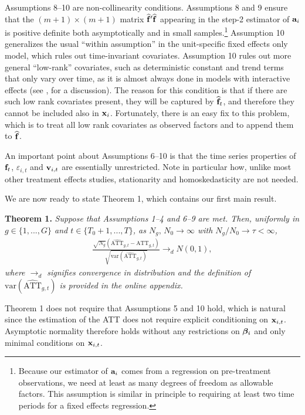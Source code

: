 \documentclass[12pt,fleqn]{article}
\begin{document}
  Assumptions 8--10 are non-collinearity conditions. Assumptions 8 and 9 ensure that the $(m+1)\times (m+1)$ matrix $\widehat{\mathbf{f}}'\widehat{\mathbf{f}}$ appearing in the step-2 estimator of $\mathbf{a}_i$ is positive definite both asymptotically and in small samples.\footnote{Because our estimator of $\mathbf{a}_i$ comes from a regression on pre-treatment observations, we need at least as many degrees of freedom as allowable factors. This assumption is similar in principle to requiring at least two time periods for a fixed effects regression.} Assumption 10 generalizes the usual ``within assumption'' in the unit-specific fixed effects only model, which rules out time-invariant covariates. Assumption 10 rules out more general ``low-rank'' covariates, such as deterministic constant and trend terms that only vary over time, as it is almost always done in models with interactive effects (see \citealp{moon2015linear}, for a discussion). The reason for this condition is that if there are such low rank covariates present, they will be captured by $\widehat{\mathbf{f}}_t$, and therefore they cannot be included also in $\mathbf{x}_{i}$. Fortunately, there is an easy fix to this problem, which is to treat all low rank covariates as observed factors and to append them to $\widehat{\mathbf{f}}$.
  
  An important point about Assumptions 6--10 is that the time series properties of $\mathbf{f}_t$, $\varepsilon_{i,t}$ and $\mathbf{v}_{i,t}$ are essentially unrestricted. Note in particular how, unlike most other treatment effects studies, stationarity and homoskedasticity are not needed.
  
  We are now ready to state Theorem 1, which contains our first main result.
  
  \bigskip
  
  \noindent \textbf{Theorem 1.} \emph{Suppose that Assumptions 1--4 and 6--9 are met. Then, uniformly in $g \in \{1,...,G\}$ and $t\in \{T_0+1,...,T\}$, as $N_g,\,N_0\to\infty$ with $N_g/N_0 \to \tau < \infty$,}
  \begin{align}
  \frac{\sqrt{N_g}(\widehat{\mathrm{ATT}}_{g,t} - \mathrm{ATT}_{g,t})}{\sqrt{\mathrm{var}(\widehat{\mathrm{ATT}}_{g,t})}} \to_d N(0, 1 ),
  \end{align}
  \emph{where $\to_d$ signifies convergence in distribution and the definition of $\mathrm{var}(\widehat{\mathrm{ATT}}_{g,t})$ is provided in the online appendix.}
  
  \bigskip
  
  Theorem 1 does not require that Assumptions 5 and 10 hold, which is natural since the estimation of the ATT does not require explicit conditioning on $\mathbf{x}_{i,t}$. Asymptotic normality therefore holds without any restrictions on $\boldsymbol{\beta}_i$ and only minimal conditions on $\mathbf{x}_{i,t}$.
  
\end{document}
